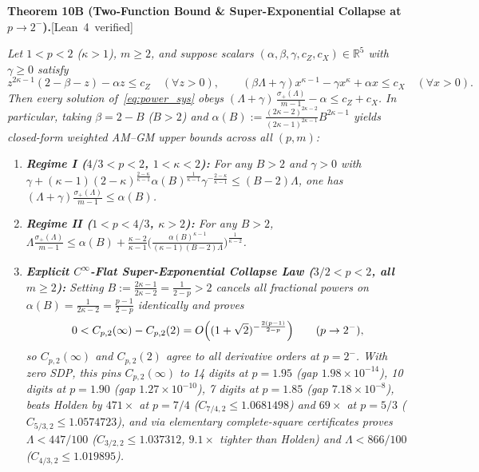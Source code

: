 \documentclass[10pt,letterpaper]{article}
\newcommand{\leanbadge}[1]{\mbox{\sffamily\scriptsize\color{leanborder}[#1]}}
\newcommand{\R}{\mathbb{R}}
\begin{document}
\begin{tcolorbox}[mathbox]
\textbf{Theorem 10B (Two-Function Bound \& Super-Exponential Collapse at $p \to 2^-$).}\hfill\leanbadge{Lean~4 verified}\par\vspace{1.5pt}
\emph{Let $1 < p < 2$ ($\kappa > 1$), $m \ge 2$, and suppose scalars $(\alpha, \beta, \gamma, c_Z, c_X) \in \R^5$ with $\gamma \ge 0$ satisfy}
\[
  z^{2\kappa - 1}(2 - \beta - z) - \alpha z \le c_Z \quad (\forall z > 0),
  \qquad
  (\beta\Lambda + \gamma)x^{\kappa - 1} - \gamma x^\kappa + \alpha x \le c_X \quad (\forall x > 0).
\]
\emph{Then every solution of~\eqref{eq:power_sys} obeys $(\Lambda + \gamma)\,\frac{\sigma_+(\Lambda)}{m - 1} - \alpha \le c_Z + c_X$. In particular, taking $\beta = 2 - B$ ($B > 2$) and $\alpha(B) := \frac{(2\kappa-2)^{2\kappa-2}}{(2\kappa-1)^{2\kappa-1}} B^{2\kappa-1}$ yields closed-form weighted AM--GM upper bounds across all $(p, m)$:}
\begin{enumerate}[label=(\alph*),leftmargin=1.8em,itemsep=2pt,topsep=2pt]
  \item \emph{\textbf{Regime I ($4/3 < p < 2$, $1 < \kappa < 2$):} For any $B > 2$ and $\gamma > 0$ with $\gamma + (\kappa-1)(2-\kappa)^{\frac{2-\kappa}{\kappa-1}}\alpha(B)^{\frac{1}{\kappa-1}}\gamma^{-\frac{2-\kappa}{\kappa-1}} \le (B - 2)\Lambda$, one has $(\Lambda + \gamma)\frac{\sigma_+(\Lambda)}{m-1} \le \alpha(B)$.}
  \item \emph{\textbf{Regime II ($1 < p < 4/3$, $\kappa > 2$):} For any $B > 2$, $\Lambda\frac{\sigma_+(\Lambda)}{m-1} \le \alpha(B) + \frac{\kappa-2}{\kappa-1}\bigl(\frac{\alpha(B)^{\kappa-1}}{(\kappa-1)(B-2)\Lambda}\bigr)^{\frac{1}{\kappa-2}}$.}
  \item \emph{\textbf{Explicit $C^\infty$-Flat Super-Exponential Collapse Law ($3/2 < p < 2$, all $m \ge 2$):} Setting $B := \frac{2\kappa-1}{2\kappa-2} = \frac{1}{2 - p} > 2$ cancels all fractional powers on $\alpha(B) = \frac{1}{2\kappa-2} = \frac{p-1}{2-p}$ identically and proves}
  \[
    0 < C_{p,2}(\infty) - C_{p,2}(2) = O\Bigl((1 + \sqrt{2})^{-\frac{2(p-1)}{2-p}}\Bigr) \qquad (p \to 2^-),
  \]
  \emph{so $C_{p,2}(\infty)$ and $C_{p,2}(2)$ agree to all derivative orders at $p = 2^-$. With zero SDP, this pins $C_{p,2}(\infty)$ to 14 digits at $p = 1.95$ (gap $1.98\times 10^{-14}$), 10 digits at $p = 1.90$ (gap $1.27\times 10^{-10}$), 7 digits at $p = 1.85$ (gap $7.18\times 10^{-8}$), beats Holden by $471\times$ at $p = 7/4$ ($C_{7/4,2} \le 1.0681498$) and $69\times$ at $p = 5/3$ ($C_{5/3,2} \le 1.0574723$), and via elementary complete-square certificates proves $\Lambda < 447/100$ ($C_{3/2,2} \le 1.037312$, $9.1\times$ tighter than Holden) and $\Lambda < 866/100$ ($C_{4/3,2} \le 1.019895$).}
\end{enumerate}
\end{tcolorbox}
\end{document}
